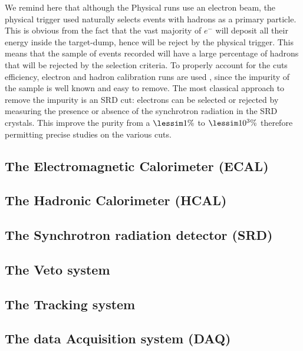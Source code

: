We remind here that although the Physical runs use an electron beam, the physical trigger used naturally selects events with hadrons as a primary particle. This is obvious from the fact that the vast majority of $e^-$ will deposit all their energy inside the target-dump, hence will be reject by the physical trigger. This means that the sample of events recorded will have a large percentage of hadrons that will be rejected by the selection criteria. To properly account for the cuts efficiency, electron and hadron calibration runs are used , since the impurity of the sample is well known and easy to remove. The most classical approach to remove the impurity is an SRD cut: electrons can be selected or rejected by measuring the presence or absence  of the synchrotron radiation in the SRD crystals. This improve the purity from a $\lessim 1\%$ to $\lessim 10^{3}\%$ therefore permitting precise studies on the various cuts.

\subsection{The Electromagnetic Calorimeter (ECAL)}
\label{chapter2:sec:detectors-ecal}

\subsection{The Hadronic Calorimeter (HCAL)}
\label{chapter2:sec:detectors-hcal}

\subsection{The Synchrotron radiation detector (SRD)}
\label{chapter2:sec:detectors-srd}

\subsection{The Veto system}
\label{chapter2:sec:detectors-veto}

\subsection{The Tracking system}
\label{chapter2:sec:detectors-tracking}

\subsection{The data Acquisition system (DAQ)}
\label{chapter2:sec:daq}

